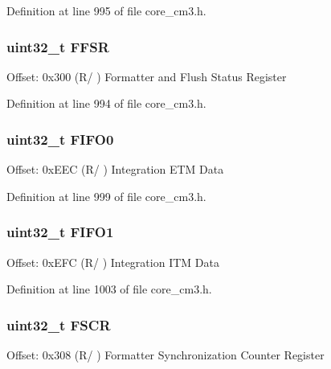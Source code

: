 Definition at line 995 of file core\+\_\+cm3.\+h.

\subsubsection[{\texorpdfstring{F\+F\+SR}{FFSR}}]{ uint32\+\_\+t F\+F\+SR}\hypertarget{struct_t_p_i___type_a2a049b49e9da6772d38166397ce8fc70}{}\label{struct_t_p_i___type_a2a049b49e9da6772d38166397ce8fc70}
Offset\+: 0x300 (R/ ) Formatter and Flush Status Register 

Definition at line 994 of file core\+\_\+cm3.\+h.

\subsubsection[{\texorpdfstring{F\+I\+F\+O0}{FIFO0}}]{ uint32\+\_\+t F\+I\+F\+O0}\hypertarget{struct_t_p_i___type_ace73d78eff029b698e11cd5cf3efaf94}{}\label{struct_t_p_i___type_ace73d78eff029b698e11cd5cf3efaf94}
Offset\+: 0x\+E\+EC (R/ ) Integration E\+TM Data 

Definition at line 999 of file core\+\_\+cm3.\+h.

\subsubsection[{\texorpdfstring{F\+I\+F\+O1}{FIFO1}}]{ uint32\+\_\+t F\+I\+F\+O1}\hypertarget{struct_t_p_i___type_abad7737b3d46cc6d4813d37171d29745}{}\label{struct_t_p_i___type_abad7737b3d46cc6d4813d37171d29745}
Offset\+: 0x\+E\+FC (R/ ) Integration I\+TM Data 

Definition at line 1003 of file core\+\_\+cm3.\+h.

\subsubsection[{\texorpdfstring{F\+S\+CR}{FSCR}}]{ uint32\+\_\+t F\+S\+CR}\hypertarget{struct_t_p_i___type_a36370b2b0879b7b497f6dd854ba02873}{}\label{struct_t_p_i___type_a36370b2b0879b7b497f6dd854ba02873}
Offset\+: 0x308 (R/ ) Formatter Synchronization Counter Register 

